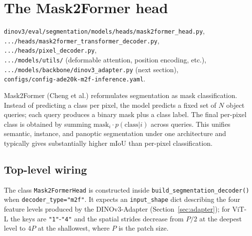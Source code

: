 \documentclass[11pt,a4paper]{article}
\begin{document}
\section{The Mask2Former head}
\label{sec:m2f}

\begin{srcbox}
\texttt{dinov3/eval/segmentation/models/heads/mask2former\_head.py},\\
\texttt{.../heads/mask2former\_transformer\_decoder.py},\\
\texttt{.../heads/pixel\_decoder.py},\\
\texttt{.../models/utils/} (deformable attention, position encoding, etc.),\\
\texttt{.../models/backbone/dinov3\_adapter.py} (next section),\\
\texttt{configs/config-ade20k-m2f-inference.yaml}.
\end{srcbox}

Mask2Former (Cheng et al.) reformulates segmentation as mask
classification. Instead of predicting a class per pixel, the model
predicts a fixed set of $N$ object queries; each query produces a binary
mask plus a class label. The final per-pixel class is obtained by summing
$\text{mask}_i \cdot p(\text{class}|i)$ across queries. This unifies
semantic, instance, and panoptic segmentation under one architecture and
typically gives substantially higher mIoU than per-pixel classification.

\subsection{Top-level wiring}

The class \texttt{Mask2FormerHead} is constructed inside
\texttt{build\_segmentation\_decoder()} when \texttt{decoder\_type="m2f"}.
It expects an \texttt{input\_shape} dict describing the four feature levels
produced by the DINOv3-Adapter (Section~\ref{sec:adapter}); for ViT-L the
keys are \texttt{"1"}-\texttt{"4"} and the spatial strides decrease from
$P/2$ at the deepest level to $4P$ at the shallowest, where $P$ is the
patch size.
\end{document}
